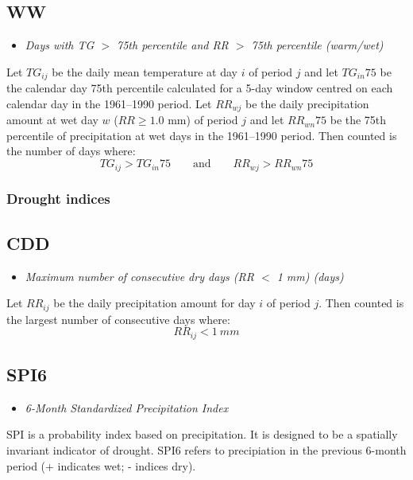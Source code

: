 \documentclass[a4paper,11pt]{article}
\begin{document}
\subsection*{WW}
\begin{itemize}
\item \textit{Days with TG $>$ 75th percentile and RR $>$ 75th percentile (warm/wet)}
\end{itemize}
Let $TG_{ij}$ be the daily mean temperature at day $i$ of period $j$
and let $TG_{in}75$ be the calendar day 75th percentile calculated for
a 5-day window centred on each calendar day in the 1961--1990
period. Let $RR_{wj}$ be the daily precipitation amount at wet day $w$
($RR\geq1.0$ mm) of period $j$ and let $RR_{wn}75$ be the 75th
percentile of precipitation at wet days in the 1961--1990 period. Then
counted is the number of days where:
\begin{equation*}
TG_{ij} > TG_{in}75 \qquad \textrm{and} \qquad RR_{wj} > RR_{wn}75
\end{equation*}


\subsubsection{Drought indices}

\subsection*{CDD}
\begin{itemize}
\item \textit{Maximum number of consecutive dry days (RR $<$ 1 mm) (days)}
\end{itemize}
Let $RR_{ij}$ be the daily precipitation amount for day $i$ of period
$j$. Then counted is the largest number of consecutive days where:
\begin{equation*}
RR_{ij} < 1~mm
\end{equation*}

\subsection*{SPI6}
\begin{itemize}
\item \textit{6-Month Standardized Precipitation Index}
\end{itemize}
SPI is a probability index based on precipitation. It is designed to
be a spatially invariant indicator of drought. SPI6 refers to
precipiation in the previous 6-month period (+ indicates wet; -
indices dry).
\end{document}
